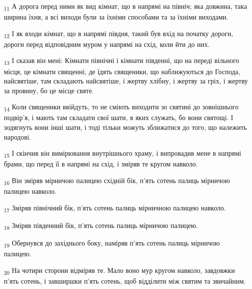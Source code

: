 \begin{tcolorbox}
\textsubscript{11} А дорога перед ними як вид кімнат, що в напрямі на північ; яка довжина, така ширина їхня, а всі виходи були за їхніми способами та за їхніми виходами.
\end{tcolorbox}
\begin{tcolorbox}
\textsubscript{12} І як входи кімнат, що в напрямі півдня, такий був вхід на початку дороги, дороги перед відповідним муром у напрямі на схід, коли йти до них.
\end{tcolorbox}
\begin{tcolorbox}
\textsubscript{13} І сказав він мені: Кімнати північні і кімнати південні, що на переді вільного місця, це кімнати священні, де їдять священики, що наближуються до Господа, найсвятіше, там складають найсвятіше, і жертву хлібну, і жертву за гріх, і жертву за провину, бо це місце святе.
\end{tcolorbox}
\begin{tcolorbox}
\textsubscript{14} Коли священики ввійдуть, то не сміють виходити зо святині до зовнішнього подвір'я, і мають там складати свої шати, в яких служать, бо вони святощі. І зодягнуть вони інші шати, і тоді тільки можуть зближатися до того, що належить народові.
\end{tcolorbox}
\begin{tcolorbox}
\textsubscript{15} І скінчив він вимірювання внутрішнього храму, і випровадив мене в напрямі брами, що перед її в напрямі на схід, і зміряв те кругом навколо.
\end{tcolorbox}
\begin{tcolorbox}
\textsubscript{16} Він зміряв мірничою палицею східній бік, п'ять сотень палиць мірничою палицею навколо.
\end{tcolorbox}
\begin{tcolorbox}
\textsubscript{17} Зміряв північний бік, п'ять сотень палиць мірничною палицею навколо.
\end{tcolorbox}
\begin{tcolorbox}
\textsubscript{18} Зміряв південний бік, п'ять сотень палиць мірничою палицею.
\end{tcolorbox}
\begin{tcolorbox}
\textsubscript{19} Обернувся до західнього боку, наміряв п'ять сотень палиць мірничою палицею.
\end{tcolorbox}
\begin{tcolorbox}
\textsubscript{20} На чотири сторони відміряв те. Мало воно мур кругом навколо, завдовжки п'ять сотень, і завширшки п'ять сотень, щоб відділити між святим та звичайним.
\end{tcolorbox}
